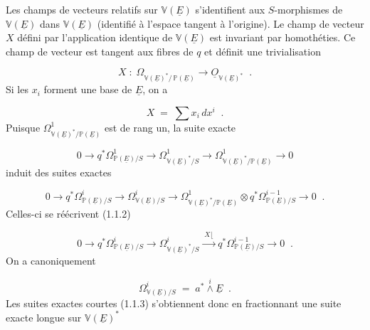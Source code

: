 Les champs de vecteurs relatifs sur $\mathbb{V}(\underline{E})$ s'identifient aux $S$-morphismes de $\mathbb{V}(\underline{E})$ dans $\mathbb{V}(\underline{E})$ (identifié à l'espace tangent à l'origine). Le champ de vecteur $X$ défini par l'application identique de $\mathbb{V}(\underline{E})$ est invariant par homothéties. Ce champ de vecteur est tangent aux fibres de $q$ et définit une trivialisation

\begin{equation}\tag{1.1.2}
X \;:\; \Omega_{\mathbb{V}(\underline{E})^*/\,\mathbb{P}(\underline{E})} \longrightarrow \underline{O}_{\mathbb{V}(\underline{E})^*} \;\; .
\end{equation}
Si les $x_i$ forment une base de $\underline{E}$, on a

\begin{equation*}
X \;=\; \sum x_i \, dx^i \;\; .
\end{equation*}
Puisque $\Omega^1_{\mathbb{V}(\underline{E})^*/\mathbb{P}(\underline{E})}$ est de rang un, la suite exacte

\begin{equation*}
0 \longrightarrow q^*\Omega^1_{\mathbb{P}(\underline{E})/S} \longrightarrow \Omega^1_{\mathbb{V}(\underline{E})^*/S} \longrightarrow \Omega^1_{\mathbb{V}(\underline{E})^*/\mathbb{P}(\underline{E})} \longrightarrow 0
\end{equation*}
induit des suites exactes

\begin{equation*}
0 \longrightarrow q^*\Omega^i_{\mathbb{P}(\underline{E})/S} \longrightarrow \Omega^i_{\mathbb{V}(\underline{E})/S} \longrightarrow \Omega^1_{\mathbb{V}(\underline{E})^*/\mathbb{P}(\underline{E})} \otimes q^*\Omega^{i-1}_{\mathbb{P}(\underline{E})/S} \longrightarrow 0 \;\; .
\end{equation*}
Celles-ci se réécrivent (1.1.2)

\begin{equation}\tag{1.1.3}
0 \longrightarrow q^*\Omega^i_{\mathbb{P}(\underline{E})/S} \longrightarrow \Omega^i_{\mathbb{V}(\underline{E})^*/S} \xrightarrow{\;X\lfloor\;} q^*\Omega^{i-1}_{\mathbb{P}(\underline{E})/S} \longrightarrow 0 \;\; .
\end{equation}
On a canoniquement

\begin{equation}\tag{1.1.4}
\Omega^i_{\mathbb{V}(\underline{E})/S} \;=\; a^* \overset{i}{\wedge} \underline{E} \;\; .
\end{equation}
Les suites exactes courtes (1.1.3) s'obtiennent donc en fractionnant une suite exacte longue sur $\mathbb{V}(\underline{E})^*$

